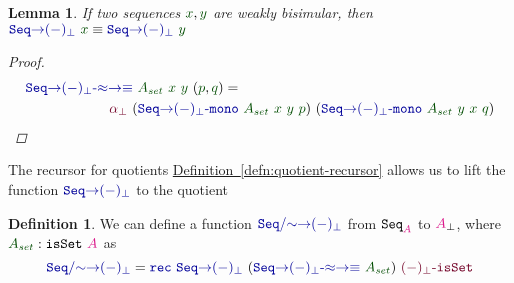 \documentclass[twoside,11pt,openright]{report}
\theoremstyle{plain} %
\newtheorem{lem}[thm]{Lemma}
\theoremstyle{definition}
\newtheorem{defn}[thm]{Definition}%
\theoremstyle{remark}
\newcommand*{\defref}[1]{\hyperref[defn:#1]{Definition~\ref*{defn:#1}}}
\newcommand*{\term}[1]{\textcolor{green!30!black}{#1}} %
\newcommand*{\type}[1]{\textcolor{magenta!90!black}{#1}}
\newcommand*{\function}[1]{\textcolor{blue!60!black}{\ensuremath{\mathtt{#1}}}}
\newcommand*{\constructor}[1]{\textcolor{purple!60!black}{\ensuremath{\mathtt{#1}}}}
\newcommand*{\typeformer}[1]{\ensuremath{\mathtt{#1}}}
\begin{document}
\begin{lem}
  If two sequences \(\term{x},\term{y}\) are weakly bisimular, then \(\function{Seq{\rightarrow}(-)_\bot}~\term{x} \equiv \function{Seq{\rightarrow}(-)_\bot}~\term{y}\)
  \begin{proof}
    \begin{equation}
      \begin{aligned}
        &\function{Seq{\rightarrow}(-)_\bot\text{-}{\approx}{\rightarrow}{\equiv}}~\term{A_{set}}~\term{x}~\term{y}~(\term{p} , \term{q}) = \\
        &\qquad\qquad\qquad\constructor{\alpha_{\bot}}~(\function{Seq{\rightarrow}(-)_\bot\text{-}mono}~\term{A_{set}}~\term{x}~\term{y}~\term{p})~(\function{Seq{\rightarrow}(-)_\bot\text{-}mono}~\term{A_{set}}~\term{y}~\term{x}~\term{q})
      \end{aligned}
    \end{equation}
  \end{proof}
\end{lem}
\noindent The recursor for quotients \defref{quotient-recursor} allows us to lift the function \(\function{Seq{\rightarrow}(-)_\bot}\) to the quotient
\begin{defn}
  \label{eq:QuotientedSeqToPartialityMonad}
  We can define a function \(\function{Seq/{\sim}{\rightarrow}(-)_\bot}\) from \(\typeformer{Seq}_{\type{A}}\) to \(\type{A}_{\bot}\), where \(\term{A_{set}} : \typeformer{isSet}~\type{A}\) as
  \begin{equation}
    \function{Seq/{\sim}{\rightarrow}(-)_\bot} = \function{rec}~\function{Seq{\rightarrow}(-)_\bot}~(\function{Seq{\rightarrow}(-)_\bot\text{-}{\approx}{\rightarrow}{\equiv}}~\term{A_{set}})~\constructor{(-)_\bot\text{-}isSet}
  \end{equation} 
\end{defn}
\end{document}
